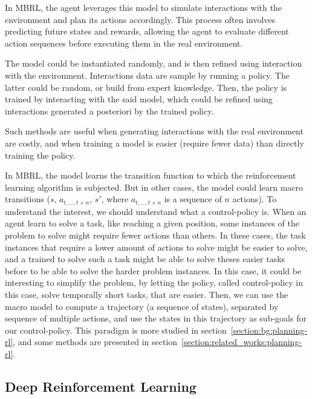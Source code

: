 In MBRL, the agent leverages this model to simulate interactions with the environment and plan its actions accordingly.
This process often involves predicting future states and rewards, allowing the agent to evaluate different action
sequences before executing them in the real environment.

The model could be instantiated randomly, and is then refined using interaction with the environment.
Interactions data are sample by running a policy.
The latter could be random, or build from expert knowledge.
Then, the policy is trained by interacting with the said model, which could be refined using interactions generated a
posteriori by the trained policy.

Such methods are useful when generating interactions with the real environment are costly, and when training a model
is easier (require fewer data) than directly training the policy.

In MBRL, the model learns the transition function to which the reinforcement learning algorithm is subjected.
But in other cases, the model could learn macro transitions ($s$, $a_{t, \dots, t+n}$, $s'$, where $a_{t, \dots, t+n}$
is a sequence of $n$ actions).
To understand the interest, we should understand what a control-policy is.
When an agent learn to solve a task, like reaching a given position, some instances of the problem to solve might
require fewer actions than others.
In these cases, the task instances that require a lower amount of actions to solve might be easier to solve, and a
trained to solve such a task might be able to solve theses easier tasks before to be able to solve the harder problem
instances.
In this case, it could be interesting to simplify the problem, by letting the policy, called control-policy in this
case, solve temporally short tasks, that are easier.
Then, we can use the macro model to compute a trajectory (a sequence of states), separated by sequence of multiple
actions, and use the states in this trajectory as sub-goals for our control-policy.
This paradigm is more studied in section~\ref{section:bg:planning-rl}, and some methods are presented in
section~\ref{section:related_works:planning-rl}.

\subsection{Deep Reinforcement Learning}\label{subsection:bg:rl:deep-reinforcement-learning}


